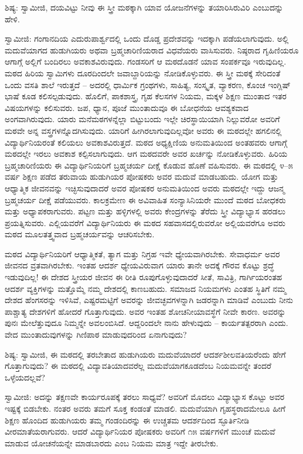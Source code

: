 ಶಿಷ್ಯ: ಸ್ವಾಮೀಜಿ, ದಯವಿಟ್ಟು ನೀವು ಈ ಸ್ತ್ರೀ ಮಠಕ್ಕಾಗಿ ಯಾವ ಯೋಜನೆಗಳನ್ನು ತಯಾರಿಸಿರುವಿರಿ ಎಂಬುದನ್ನು ಹೇಳಿ.

ಸ್ವಾಮೀಜಿ: ಗಂಗಾನದಿಯ ಎದುರುಪಾರ್ಶ್ವದಲ್ಲಿ ಒಂದು ದೊಡ್ಡ ಪ್ರದೇಶವನ್ನು ಇದಕ್ಕಾಗಿ ಪಡೆಯಲಾಗುವುದು. ಅಲ್ಲಿ ಮದುವೆಯಾಗದ ಹುಡುಗಿಯರು ಅಥವಾ ಬ್ರಹ್ಮಚಾರಿಣಿಯರಾದ ವಿಧವೆಯರು ವಾಸಿಸುವರು. ನಿಷ್ಠರಾದ ಗೃಹಿಣಿಯರೂ ಆಗಾಗ್ಗೆ ಅಲ್ಲಿಗೆ ಬಂದಿರಲು ಅವಕಾಶವಿರುವುದು. ಗಂಡಸರಿಗೆ ಆ ಮಠದೊಡನೆ ಯಾವ ಸಂಪರ್ಕವೂ ಇರುವುದಿಲ್ಲ. ಮಠದ ಹಿರಿಯ ಸ್ವಾಮಿಗಳು ದೂರದಿಂದಲೇ ಜವಾಬ್ದಾರಿಯನ್ನು ನೋಡಿಕೊಳ್ಳುವರು. ಈ ಸ್ತ್ರೀ ಮಠಕ್ಕೆ ಸೇರಿದಂತೆ ಒಂದು ವಸತಿ ಶಾಲೆ ಇರುತ್ತದೆ – ಅದರಲ್ಲಿ ಧಾರ್ಮಿಕ ಗ್ರಂಥಗಳು, ಸಾಹಿತ್ಯ, ಸಂಸ್ಕೃತ, ವ್ಯಾಕರಣ, ಕೊಂಚ ಇಂಗ್ಲಿಷ್ ಭಾಷೆ ಕೂಡ ಕಲಿಸಲ್ಪಡುವುದು. ಹೊಲಿಗೆ, ಪಾಕಶಾಸ್ತ್ರ, ಗೃಹ ಕೆಲಸಗಳ ನಿಯಮ, ಮಕ್ಕಳ ಶಿಕ್ಷಣ ಮುಂತಾದ ಇತರ ವಿಷಯಗಳನ್ನು ಕಲಿಸುವರು. ಜಪ, ಧ್ಯಾನ, ಪೂಜೆ ಮುಂತಾದುವೂ ಈ ಬೋಧನೆಯ ಆವಶ್ಯಕವಾದ ಅಂಗವಾಗಿರುವುದು. ಯಾರು ಮನೆಮಠಗಳನ್ನೆಲ್ಲಾ ಬಿಟ್ಟುಬಂದು ಇಲ್ಲೇ ಚಿರಸ್ಥಾಯಿಯಾಗಿ ನಿಲ್ಲುವರೋ ಅವರಿಗೆ ಮಠವೇ ಅನ್ನ ವಸ್ತ್ರಗಳನ್ನೊದಗಿಸುವುದು. ಯಾರಿಗೆ ಹೀಗಿರಲಾಗುವುದಿಲ್ಲವೋ ಅವರು ಈ ಮಠದಲ್ಲೇ ಹಗಲಿನಲ್ಲಿ ವಿದ್ಯಾರ್ಥಿನಿಯರಂತೆ ಕಲಿಯಲು ಅವಕಾಶವಿರುತ್ತದೆ. ಮಠದ ಅಧ್ಯಕ್ಷಿಣಿಯ ಅನುಮತಿಯಿಂದ ಅಂತಹವರು ಆಗಾಗ್ಗೆ ಮಠದಲ್ಲೇ ಇರಲು ಅವಕಾಶ ಕಲ್ಪಿಸಲಾಗುವುದು. ಆಗ ಮಠದವರೇ ಅವರ ಖರ್ಚನ್ನು ನೋಡಿಕೊಳ್ಳುವರು. ಹಿರಿಯ ಬ್ರಹ್ಮಚಾರಿಣಿಯರು ಈ ವಿದ್ಯಾರ್ಥಿನಿಯರಿಗೆ ಬ್ರಹ್ಮಚರ್ಯ ದೀಕ್ಷೆ ಕೊಡುವ ಹೊಣೆ ವಹಿಸುವರು. ಈ ಮಠದಲ್ಲಿ ೪–೫ ವರ್ಷ ಶಿಕ್ಷಣ ಪಡೆದ ತರುವಾಯ ಹುಡುಗಿಯರ ಪೋಷಕರು ಅವರ ಮದುವೆ ಮಾಡಬಹುದು. ಯೋಗ ಮತ್ತು ಆಧ್ಯಾತ್ಮಿಕ ಜೀವನವನ್ನು ಇಚ್ಛಿಸುವುದಾದರೆ ಅವರ ಪೋಷಕರ ಅನುಮತಿಯಿಂದ ಅವರು ಮಠದಲ್ಲೇ ಇದ್ದು ಆಜನ್ಮ ಬ್ರಹ್ಮಚರ್ಯ ದೀಕ್ಷೆ ಪಡೆಯುವರು. ಕಾಲಕ್ರಮೇಣ ಈ ಅವಿವಾಹಿತ ಸಂನ್ಯಾಸಿನಿಯರೇ ಮುಂದೆ ಮಠದ ಬೋಧಕರು ಮತ್ತು ಅಧ್ಯಾಪಕರಾಗುವರು. ಪಟ್ಟಣ ಮತ್ತು ಹಳ್ಳಿಗಳಲ್ಲಿ ಅವರು ಕೇಂದ್ರಗಳನ್ನು ತೆರೆದು ಸ್ತ್ರೀ ವಿದ್ಯಾಭ್ಯಾಸ ಹರಡಲು ಪ್ರಯತ್ನಿಸುವರು. ಎಲ್ಲಿಯವರೆಗೆ ವಿದ್ಯಾರ್ಥಿನಿಯರು ಈ ಮಠದ ಸಹವಾಸದಲ್ಲಿರುವರೋ ಅಲ್ಲಿಯವರೆಗೂ ಅವರು ಮಠದ ಮೂಲತತ್ತ್ವವಾದ ಬ್ರಹ್ಮಚರ್ಯವನ್ನು ಆಚರಿಸಬೇಕು.

ಮಠದ ವಿದ್ಯಾರ್ಥಿನಿಯರಿಗೆ ಆಧ್ಯಾತ್ಮಿಕತೆ, ತ್ಯಾಗ ಮತ್ತು ನಿಗ್ರಹ ಇವೇ ಧ್ಯೇಯವಾಗಿರಬೇಕು. ಸೇವಾಧರ್ಮ ಅವರ ಜೀವನದ ವ್ರತವಾಗಿರಬೇಕು. ಇಂತಹ ಆದರ್ಶ ಧ್ಯೇಯವಿರುವಾಗ ಯಾರು ತಾನೇ ಅದಕ್ಕೆ ಗೌರವ ಕೊಟ್ಟು ಶ್ರದ್ಧೆ ಇಡುವುದಿಲ್ಲ! ಈ ದೇಶದ ಸ್ತ್ರೀಯರ ಜೀವನ ಈ ರೀತಿ ರೂಪುಗೊಳ್ಳುವುದಾದರೆ ಸೀತೆ, ಸಾವಿತ್ರಿ, ಗಾರ್ಗಿಯರಂತಹ ಆದರ್ಶ ವ್ಯಕ್ತಿಗಳನ್ನು ಮತ್ತೊಮ್ಮೆ ನಮ್ಮ ದೇಶದಲ್ಲಿ ಕಾಣಬಹುದು. ಸಮಾಜದ ನಿಯಮಗಳು ಎಂತಹ ಸ್ಥಿತಿಗೆ ನಮ್ಮ ದೇಶದ ಹೆಂಗಸರನ್ನು ಇಳಿಸಿವೆ, ಎಷ್ಟರಮಟ್ಟಿಗೆ ಅವರನ್ನು ಜೀವಚ್ಛವಗಳನ್ನಾಗಿ ಜಡರನ್ನಾಗಿ ಮಾಡಿವೆ ಎಂಬುದು ನೀನು ಪಾಶ್ಚಾತ್ಯ ದೇಶಗಳಿಗೆ ಹೋದರೆ ಗೊತ್ತಾಗುವುದು. ಅವರ ಇಂತಹ ಶೋಚನೀಯಾವಸ್ಥೆಗೆ ನೀವೇ ಕಾರಣ. ಅವರನ್ನು ಪುನಃ ಮೇಲೆತ್ತುವುದೂ ನಿಮ್ಮನ್ನೇ ಅವಲಂಬಿಸಿದೆ. ಆದ್ದರಿಂದಲೇ ನಾನು ಹೇಳುವುದು – ಕಾರ್ಯತತ್ಪರರಾಗಿ ಎಂದು. ವೇದ ಮುಂತಾದುವುಗಳನ್ನು ಗಿಣಿಪಾಠ ಮಾಡುವುದರಿಂದ ಏನಾಗುವುದು?

ಶಿಷ್ಯ: ಸ್ವಾಮೀಜಿ, ಈ ಮಠದಲ್ಲಿ ತರಬೇತಾದ ಹುಡುಗಿಯರು ಮದುವೆಯಾದರೆ ಆದರ್ಶಶೀಲವತಿಯರೆಂದು ಹೇಗೆ ಗೊತ್ತಾಗುವುದು? ಈ ಮಠದಲ್ಲಿ ವಿದ್ಯಾವತಿಯಾದವರೆಲ್ಲ ಮದುವೆಯಾಗಕೂಡದೆಂಬ ನಿಯಮವನ್ನೇ ತಂದರೆ ಒಳ್ಳೆಯದಲ್ಲವೆ?

ಸ್ವಾಮೀಜಿ: ಅದನ್ನು ತಕ್ಷಣವೇ ಕಾರ್ಯರೂಪಕ್ಕೆ ತರಲು ಸಾಧ್ಯವೆ? ಅವರಿಗೆ ಮೊದಲು ವಿದ್ಯಾಭ್ಯಾಸ ಕೊಟ್ಟು ಅವರ ಇಷ್ಟಕ್ಕೆ ಬಿಡಬೇಕು. ನಂತರ ಅವರು ತಮಗೆ ಸೂಕ್ತ ಕಂಡಂತೆ ಮಾಡಲಿ. ಮದುವೆಯಾಗಿ ಗೃಹಸ್ಥರಾದಮೇಲೂ ಹೀಗೆ ಶಿಕ್ಷಣ ಹೊಂದಿದ ಹುಡುಗಿಯರು ತಮ್ಮ ಗಂಡಂದಿರನ್ನು ಈ ಉಚ್ಚತಮ ಆದರ್ಶದಿಂದ ಸ್ಫೂರ್ತಿನೀಡಿ ವೀರಮಾತೆಯರಾಗುವರು. ಆದರೆ ವಿದ್ಯಾರ್ಥಿನಿಯರ ಪೋಷಕರು ಅವರಿಗೆ ೧೫ ವರ್ಷಗಳಿಗೆ ಮುಂಚೆ ಮದುವೆ ಮಾಡುವ ಯೋಚನೆಯನ್ನೇ ಮಾಡಬಾರದು ಎಂಬ ನಿಯಮ ಮಾತ್ರ ಇದ್ದೇ ತೀರಬೇಕು.

